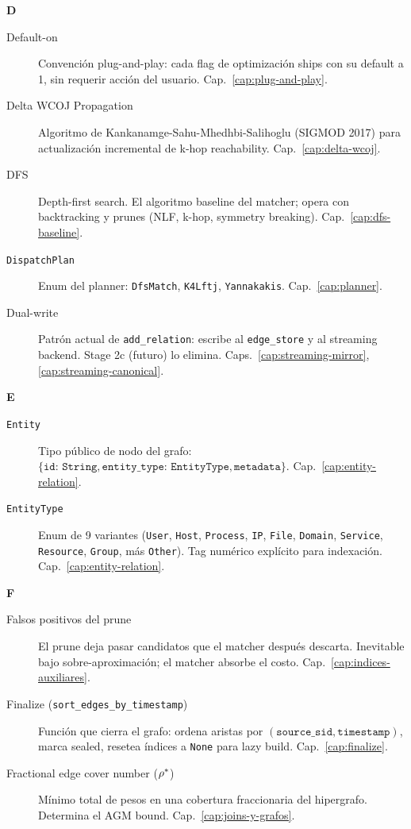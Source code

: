 \noindent
\textbf{D}

\begin{description}
    \item[Default-on] Convención plug-and-play: cada flag
    de optimización ships con su default a 1, sin requerir acción
    del usuario. Cap.~\ref{cap:plug-and-play}.

    \item[Delta WCOJ Propagation] Algoritmo de
    Kankanamge-Sahu-Mhedhbi-Salihoglu (SIGMOD 2017) para
    actualización incremental de k-hop reachability.
    Cap.~\ref{cap:delta-wcoj}.

    \item[DFS] Depth-first search. El algoritmo baseline del
    matcher; opera con backtracking y prunes (NLF, k-hop, symmetry
    breaking). Cap.~\ref{cap:dfs-baseline}.

    \item[\texttt{DispatchPlan}] Enum del planner:
    \texttt{DfsMatch}, \texttt{K4Lftj}, \texttt{Yannakakis}.
    Cap.~\ref{cap:planner}.

    \item[Dual-write] Patrón actual de
    \texttt{add\_relation}: escribe al \texttt{edge\_store} y al
    streaming backend. Stage 2c (futuro) lo elimina.
    Caps.~\ref{cap:streaming-mirror}, \ref{cap:streaming-canonical}.
\end{description}

\noindent
\textbf{E}

\begin{description}
    \item[\texttt{Entity}] Tipo público de nodo del grafo: \(\{
    \texttt{id: String}, \texttt{entity\_type: EntityType},
    \texttt{metadata} \}\). Cap.~\ref{cap:entity-relation}.

    \item[\texttt{EntityType}] Enum de 9 variantes (\texttt{User},
    \texttt{Host}, \texttt{Process}, \texttt{IP}, \texttt{File},
    \texttt{Domain}, \texttt{Service}, \texttt{Resource},
    \texttt{Group}, más \texttt{Other}). Tag numérico explícito
    para indexación. Cap.~\ref{cap:entity-relation}.
\end{description}

\noindent
\textbf{F}

\begin{description}
    \item[Falsos positivos del prune] El prune deja pasar
    candidatos que el matcher después descarta. Inevitable bajo
    sobre-aproximación; el matcher absorbe el costo.
    Cap.~\ref{cap:indices-auxiliares}.

    \item[Finalize (\texttt{sort\_edges\_by\_timestamp})]
    Función que cierra el grafo: ordena aristas por
    \((\texttt{source\_sid}, \texttt{timestamp})\), marca sealed,
    resetea índices a \texttt{None} para lazy build.
    Cap.~\ref{cap:finalize}.

    \item[Fractional edge cover number (\(\rho^{*}\))] Mínimo total
    de pesos en una cobertura fraccionaria del hipergrafo. Determina
    el AGM bound. Cap.~\ref{cap:joins-y-grafos}.
\end{description}

